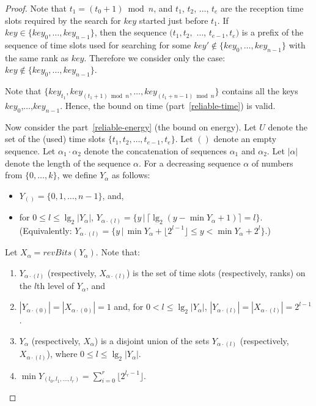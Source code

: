 \documentclass{llncs}
\begin{document}
\begin{proof}

Note that $t_1= (t_0+1)\bmod n$,
and $t_1$, $t_2$, $\ldots$, $t_e$ are the reception time slots 
required by the search for $key$ 
started just before $t_1$. 
If $key\in \{key_0,\ldots,key_{n-1}\}$,
then the sequence $(t_1,t_2,$ $\ldots$, $t_{e-1},t_e)$ is
a prefix of the sequence of time slots used for 
searching for some $key'\not\in \{key_0,\ldots,key_{n-1}\}$
with the same rank as $key$.
Therefore we consider only the case: $key\not\in \{key_0,\ldots,key_{n-1}\}$.

Note that $\{ key_{t_1}, key_{(t_1+1)\bmod n},\ldots, key_{(t_1+n-1)\bmod n}\}$
contains all the keys $key_0$,$\ldots$,$key_{n-1}$.
Hence, the bound on time (part~\ref{reliable-time}) is valid.

Now consider the part~\ref{reliable-energy} (the bound on energy).
Let $U$ denote the set of the (used) time slots $\{t_1,t_2,\ldots,t_{e-1},t_e\}$.
Let $()$ denote an empty sequence.
Let $\alpha_1\cdot\alpha_2$ denote the 
concatenation of sequences $\alpha_1$ and $\alpha_2$.
Let $|\alpha|$ denote the length of the sequence $\alpha$.
For a decreasing sequence $\alpha$ of numbers from $\{0,\ldots,k\}$, 
we define $Y_\alpha$ as follows:
\begin{itemize}
\item
  $Y_{()}=\{0,1,\ldots, n-1 \}$, and,

\item for $0\le l\le \lg_2 |Y_\alpha|$,
  $Y_{\alpha\cdot (l)}=\{ y\,|\, \lceil \lg_2(y-\min Y_\alpha+1)\rceil = l \}$.
  (Equivalently: 
   $Y_{\alpha\cdot (l)}=\{ y\,|\, \min Y_{\alpha}+\lfloor 2^{l-1}\rfloor \le y< \min Y_{\alpha}+2^l \}$.)
\end{itemize}

Let $X_\alpha=revBits(Y_\alpha)$.
Note that:
\begin{lemma}\label{basic-lemma}
\begin{enumerate}
\item
  $Y_{\alpha\cdot (l)}$ (respectively, $X_{\alpha\cdot (l)}$)
  is the set of time slots (respectively, ranks) on the $l$th level of $Y_\alpha$, and
\item
  $|Y_{\alpha\cdot(0)}|=|X_{\alpha\cdot(0)}|=1$ and,
  for $0<l\le \lg_2 |Y_\alpha| $, $|Y_{\alpha\cdot(l)}|=|X_{\alpha\cdot(l)}|=2^{l-1}$.
\item
  $Y_\alpha$ (respectively, $X_\alpha$) is
  a disjoint union of the sets $Y_{\alpha\cdot (l)}$ (respectively, $X_{\alpha\cdot (l)}$),
  where $0\le l\le \lg_2 |Y_\alpha|$. %
\item\label{basic-minimum}
  $\min Y_{(l_0,l_1,\ldots,l_r)}=\sum_{i=0}^r \lfloor 2^{l_r-1}\rfloor$.
\end{enumerate}
\end{lemma}


\end{proof}
\end{document}
